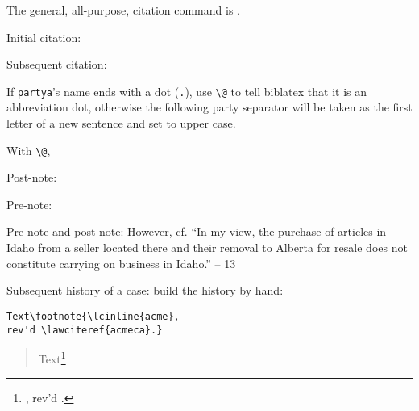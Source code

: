 \p The general, all-purpose, citation command is .

\p Initial citation: 

\p Subsequent citation: 

\p If \texttt{partya}'s name ends with a dot (\verb|.|), use \verb|\@| to tell biblatex that it is an abbreviation dot, otherwise the following party separator will be taken as the first letter of a new sentence and set to upper case.

With \verb|\@|, 


\citetrackerfalse
{}
\citetrackertrue

\p Post-note: 

\p Pre-note: 


\p Pre-note and post-note: 
{However, cf. ``In my view, the purchase of articles in Idaho from a seller located there and their removal to Alberta for resale does not constitute carrying on business in Idaho.'' -- }{13}

\p Subsequent history of a case: build the history by hand:
\begin{magpar}
\begin{verbatim}
Text\footnote{\lcinline{acme}, 
rev'd \lawciteref{acmeca}.}
\end{verbatim}
\end{magpar}
\begin{quotation}
Text\footnote{, rev'd .}
\end{quotation}

